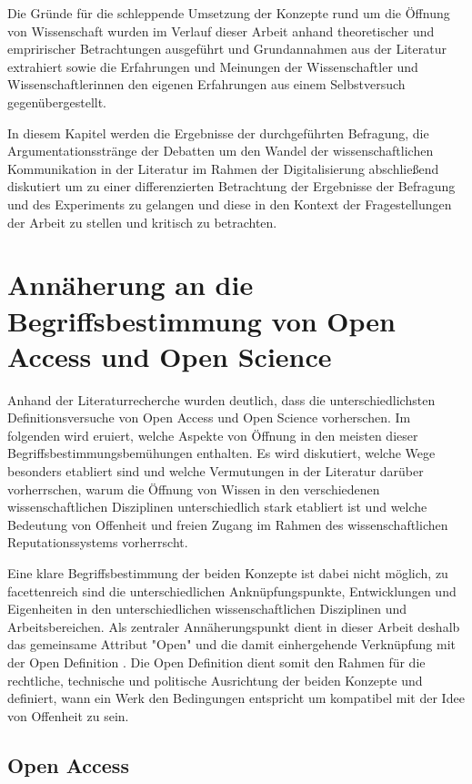 Die Gründe für die schleppende Umsetzung der Konzepte rund um die Öffnung von Wissenschaft wurden im Verlauf dieser Arbeit anhand theoretischer und empririscher Betrachtungen ausgeführt und Grundannahmen aus der Literatur extrahiert sowie die Erfahrungen und Meinungen der Wissenschaftler und Wissenschaftlerinnen den eigenen Erfahrungen aus einem Selbstversuch gegenübergestellt.

In diesem Kapitel werden die Ergebnisse der durchgeführten Befragung, die Argumentationsstränge der Debatten um den Wandel der wissenschaftlichen Kommunikation in der Literatur im Rahmen der Digitalisierung abschließend diskutiert um zu einer differenzierten Betrachtung der Ergebnisse der Befragung und des Experiments zu gelangen und diese in den Kontext der Fragestellungen der Arbeit zu stellen und kritisch zu betrachten.

\section{Annäherung an die Begriffsbestimmung von Open Access und Open Science}

Anhand der Literaturrecherche wurden deutlich, dass die unterschiedlichsten Definitionsversuche von Open Access und Open Science vorherschen. Im folgenden wird eruiert, welche Aspekte von Öffnung in den meisten dieser Begriffsbestimmungsbemühungen enthalten. Es wird diskutiert, welche Wege besonders etabliert sind und welche Vermutungen in der Literatur darüber vorherrschen, warum die Öffnung von Wissen in den verschiedenen wissenschaftlichen Disziplinen unterschiedlich stark etabliert ist und welche Bedeutung von Offenheit und freien Zugang im Rahmen des wissenschaftlichen Reputationssystems vorherrscht.

Eine klare Begriffsbestimmung der beiden Konzepte ist dabei nicht möglich, zu facettenreich sind die unterschiedlichen Anknüpfungspunkte, Entwicklungen und Eigenheiten in den unterschiedlichen wissenschaftlichen Disziplinen und Arbeitsbereichen. Als zentraler Annäherungspunkt dient in dieser Arbeit deshalb das gemeinsame Attribut "Open" und die damit einhergehende Verknüpfung mit der Open Definition \cite{open_definition}. Die Open Definition dient somit den Rahmen für die rechtliche, technische und politische Ausrichtung der beiden Konzepte und definiert, wann ein Werk den Bedingungen entspricht um kompatibel mit der Idee von Offenheit zu sein.

\subsection{Open Access}


